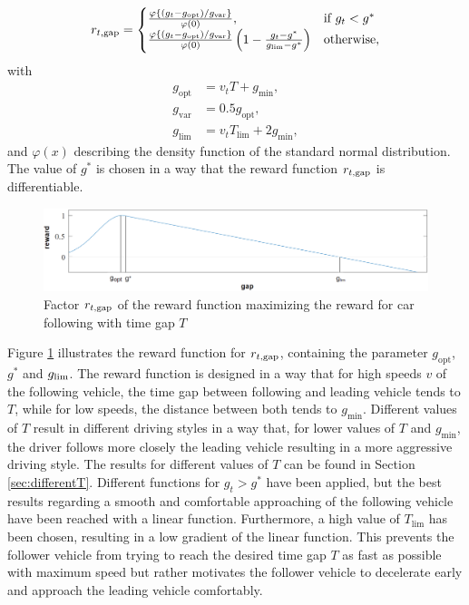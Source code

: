 \documentclass[review]{elsarticle}
\providecommand{\sub}[1]{_{\mathrm{#1}}}  %
\providecommand{\3}{{\ss}}
\begin{document}
	
	\begin{equation}
		\label{eq:r2_CFP}
		r_{t, \rm gap}  = 
		\begin{cases}
			\frac{\varphi\left\{(g_t-g\sub{opt})/g\sub{var}\right\}}{\varphi(0)}, & \text{if } g_t < g^*\\
			\frac{\varphi\left\{(g_t-g\sub{opt})/g\sub{var}\right\}}{\varphi(0)}\left(1-\frac{g_t-g^*}{g\sub{lim} - g^*}\right)  & \text{otherwise},
		\end{cases}
	\end{equation}
	with 
	\begin{align}
		g\sub{opt} &= v_tT + g\sub{min},\\
		g\sub{var} &= 0.5g\sub{opt},\\
		g\sub{lim} &= v_tT\sub{lim} + 2g\sub{min},
	\end{align}
	and $\varphi(x)$ describing the density function of the standard normal distribution. The value of $g^*$ is chosen in a way that the reward function $r_{t,\rm gap}$ is differentiable.
	\begin{figure}
		\centering
		\includegraphics[width=12cm]{images/RewardFunc1}
		\caption{Factor $r_{t, \rm gap}$ of the reward function maximizing the reward
			for car following with time gap $T$} 
		\label{fig:RewardFunc1}
	\end{figure}
	Figure \ref{fig:RewardFunc1} illustrates the reward function for
	$r_{t,\rm gap}$, containing the parameter $g\sub{opt}$, $g^*$ and $g_{\rm
		lim}$. The reward function is designed in a way that for high speeds $v$
	of the following vehicle, the time gap between following and leading
	vehicle tends to $T$, while for low speeds, the distance
	between both tends to $g\sub{min}$. Different values of $T$
	result in different driving styles in a way that, for lower values of
	$T$ and $g\sub{min}$, the driver follows
	more closely the leading vehicle resulting in a more aggressive
	driving style. The results for different values of $T$ can
	be found in Section \ref{sec:differentT}. Different functions for $g_t
	> g^*$ have been applied, but the best results regarding a smooth and
	comfortable approaching of the following vehicle have been reached with
	a linear function. Furthermore, a high value of $T\sub{lim}$ has been
	chosen, resulting in a low gradient of the linear function. This
	prevents the follower vehicle from trying to reach the desired time gap $T$
	as fast as possible with maximum speed but rather motivates the follower vehicle to decelerate early and approach the leading vehicle comfortably.
	
\end{document}
